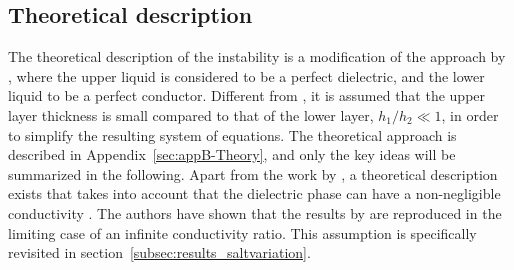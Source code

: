 \documentclass{jfm_arxiv}
\begin{document}
\subsection{Theoretical description}
\label{sec:theoretical_description}

The theoretical description of the instability is a modification of the approach by \citet{Bandopadhyay2017}, where the upper liquid is considered to be a perfect dielectric, and the lower liquid to be a perfect conductor.
Different from \citet{Bandopadhyay2017}, it is assumed that the upper layer thickness is small compared to that of the lower layer, $h_1/h_2 \ll 1$, in order to simplify the resulting system of equations.
The theoretical approach is described in Appendix~\ref{sec:appB-Theory}, and only the key ideas will be summarized in the following. 
Apart from the work by \citet{Bandopadhyay2017}, a theoretical description exists that takes into account that the dielectric phase can have a non-negligible conductivity \citep{Ward2019}. The authors have shown that the results by \citet{Bandopadhyay2017} are reproduced in the limiting case of an infinite conductivity ratio.
This assumption is specifically revisited in section~\ref{subsec:results_saltvariation}. 
\end{document}
